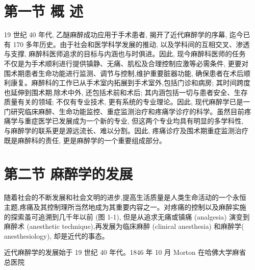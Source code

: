 \documentclass[10pt]{article}
\begin{document}
\section*{第一节 概 述}
19 世纪 40 年代, 乙醚麻醉成功应用于手术患者, 揭开了近代麻醉学的序幕, 迄今已有 170 多年历史。由于社会和医学科学发展的推动, 以及学科间的互相交叉、渗透与支撑, 麻醉科医师追求的目标与内涵也与时俱进。因此, 现今麻醉科医师的任务不仅是为手术顺利进行提供镇静、无痛、肌松及合理控制应激等必需条件, 更要对围术期患者生命功能进行监测、调节与控制,维护重要脏器功能, 确保患者在术后顺利康复。麻醉科的工作已从手术室内拓展到手术室外,包括门诊和病房; 其时间跨度也延伸到围术期,除术中外, 还包括术前和术后; 其内涵包括一切与患者安全、生存质量有关的领域; 不仅有专业技术, 更有系统的专业理论。因此, 现代麻醉学已是一门研究临床麻醉、生命功能监控、重症监测治疗和疼痛学诊疗的科学。虽然目前疼痛学与重症医学已发展成为一个新的专业, 但这两个专业均具有明显的多学科性, 与麻醉学的联系更是源远流长、难以分割。因此, 疼痛诊疗及围术期重症监测治疗既是麻醉科的责任, 更是麻醉学的一个重要组成部分。

\section*{第二节 麻醉学的发展}
随着社会的不断发展和社会文明的进步,提高生活质量是人类生命活动的一个永恒主题,疼痛及其控制理所当然地成为其重要内容之一。对疼痛的控制以及麻醉实施的探索虽可追溯到几千年以前 (图 1-1), 但是从追求无痛或镇痛 (analgesia) 演变到麻醉术 (anesthetic technique),再发展为临床麻醉 (clinical anesthesia) 和麻醉学( anesthesiology), 却是近代的事态。

近代麻醉学的发展始于 19 世纪 40 年代。1846 年 10 月 Morton 在哈佛大学麻省总医院
\end{document}
